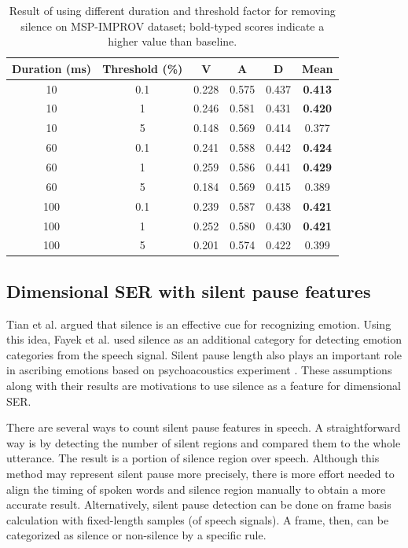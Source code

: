 \begin{table}
\caption{Result of using different duration and threshold factor for removing
silence on MSP-IMPROV dataset; bold-typed scores indicate a higher value than
baseline.}
  \begin{center}
  \begin{tabular}{c | c | c c c c}
    \hline
Duration (ms)   & Threshold (\%) &  V & A & D & Mean \\
\hline \hline
10  & 0.1  & 0.228  & 0.575   & 0.437   & \textbf{0.413} \\
10  & 1    & 0.246  & 0.581   & 0.431   & \textbf{0.420} \\
10  & 5    & 0.148  & 0.569   & 0.414   & 0.377 \\
60  & 0.1  & 0.241  & 0.588   & 0.442   & \textbf{0.424} \\
60  & 1    & 0.259  & 0.586   & 0.441   & \textbf{0.429} \\
60  & 5    & 0.184  & 0.569   & 0.415   & 0.389 \\
100 & 0.1  & 0.239  & 0.587   & 0.438   & \textbf{0.421} \\
100 & 1    & 0.252  & 0.580   & 0.430   & \textbf{0.421} \\
100 & 5    & 0.201  & 0.574   & 0.422   & 0.399 \\
    \hline
  \end{tabular}
  \label{tab:sil_remove_msp}
  \end{center}
\end{table}

\subsection{Dimensional SER with silent pause features}
Tian et al. \cite{Tian2015a} argued that silence is an effective cue for
recognizing emotion.  Using this idea, Fayek et al. \cite{Fayek2017} used
silence as an additional category for detecting emotion categories from the
speech signal. Silent pause length also plays an important role in ascribing
emotions based on psychoacoustics experiment \cite{Tisljar-Szabo2014}. These
assumptions along with their results are motivations to use silence as a
feature for dimensional SER.

There are several ways to count silent pause features in speech. A
straightforward way is by detecting the number of silent regions and compared
them to the whole utterance. The result is a portion of silence region over
speech. Although this method may represent silent pause more precisely, there
is more effort needed to align the timing of spoken words and silence region
manually to obtain a more accurate result. Alternatively, silent pause
detection can be done on frame basis calculation with fixed-length samples (of
speech signals). A frame, then, can be categorized as silence or non-silence by
a specific rule.

